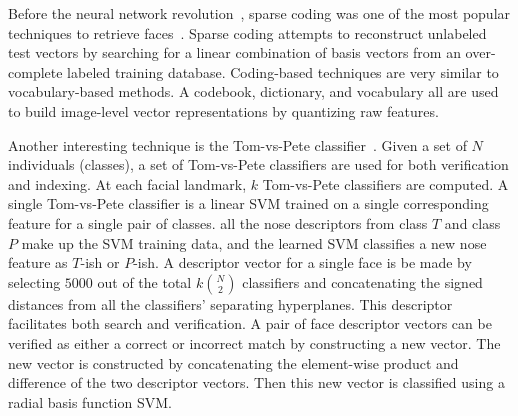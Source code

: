         Before the neural network revolution~\cite{krizhevsky_imagenet_2012}, sparse coding was one of the most
        popular techniques to retrieve faces~\cite{aharon_k_svd_2006, wright_robust_2009, zhang_sparse_2011,
        jiang_label_2013}. Sparse coding attempts to reconstruct unlabeled test vectors by searching for a linear
        combination of basis vectors from an over-complete labeled training database. Coding-based techniques are
        very similar to vocabulary-based methods. A codebook, dictionary, and vocabulary all are used to build
        image-level vector representations by quantizing raw features.

        Another interesting technique is the Tom-vs-Pete classifier~\cite{berg_tom_vs_pete_2012}. Given a set of $N$
        individuals (classes), a set of Tom-vs-Pete classifiers are used for both verification and indexing. At
        each facial landmark, $k$ Tom-vs-Pete classifiers are computed. A single Tom-vs-Pete classifier is a linear
        SVM trained on a single corresponding feature for a single pair of classes. \Eg{} all the nose
        descriptors from class $T$ and class $P$ make up the SVM training data, and the learned SVM classifies a
        new nose feature as $T$-ish or $P$-ish. A descriptor vector for a single face is be made by selecting
        $5000$ out of the total $k\binom{N}{2}$ classifiers and concatenating the signed distances from all the
        classifiers' separating hyperplanes. This descriptor facilitates both search and verification. A pair of
        face descriptor vectors can be verified as either a correct or incorrect match by constructing a new
        vector. The new vector is constructed by concatenating the element-wise product and difference of the two
        descriptor vectors. Then this new vector is classified using a radial basis function SVM{}.

